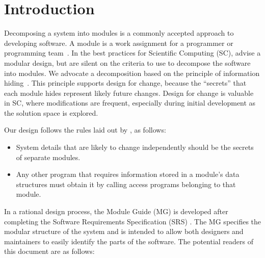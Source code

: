 \documentclass[12pt, titlepage]{article}
\begin{document}

\newpage

\tableofcontents

\listoftables

\listoffigures

\newpage


\section{Introduction}

\hspace{3ex}Decomposing a system into modules is a commonly accepted
approach to developing software.  A module is a work assignment for a
programmer or programming team~\citep{ParnasEtAl1984}.  In the best
practices for Scientific Computing (SC), \citet{WilsonEtAl2013} advise a
modular design, but are silent on the criteria to use to decompose the
software into modules.  We advocate a decomposition based on the
principle of information hiding~\citep{Parnas1972a}.  This principle
supports design for change, because the ``secrets'' that each module
hides represent likely future changes.  Design for change is valuable
in SC, where modifications are frequent, especially during initial
development as the solution space is explored.

Our design follows the rules laid out by \citet{ParnasEtAl1984}, as follows:
\begin{itemize}  
\item System details that are likely to change independently should be
  the secrets of separate modules.
\item Any other program that requires information stored in a module's
  data structures must obtain it by calling access programs belonging
  to that module.
\end{itemize}


In a rational design process, the Module Guide (MG) is developed after 
completing the Software Requirements Specification (SRS) 
\citep{ParnasEtAl1984}. The MG specifies the modular
structure of the system and is intended to allow both designers and
maintainers to easily identify the parts of the software.  The
potential readers of this document are as follows:
\end{document}
